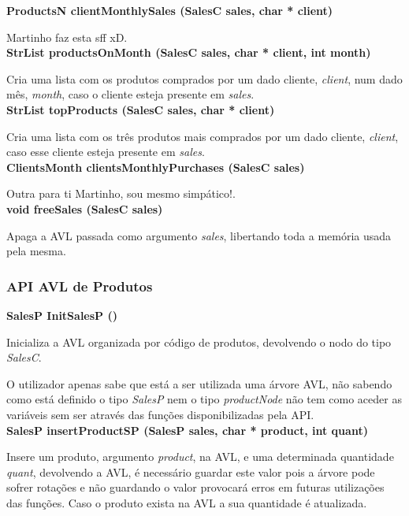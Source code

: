 \documentclass[10pt] {article}
\begin{document}
\noindent \textbf {ProductsN clientMonthlySales (SalesC sales, char * client)}
\par Martinho faz esta sff xD. \\

\noindent \textbf {StrList productsOnMonth (SalesC sales, char * client, int month)}
\par Cria uma lista com os produtos comprados por um dado cliente, \emph{client}, num dado mês, \emph{month}, 
caso o cliente esteja presente em \emph{sales}. \\

\noindent \textbf {StrList topProducts (SalesC sales, char * client)}
\par Cria uma lista com os três produtos mais comprados por um dado cliente, \emph{client}, caso esse cliente 
esteja presente em \emph{sales}. \\

\noindent \textbf {ClientsMonth clientsMonthlyPurchases (SalesC sales)}
\par Outra para ti Martinho, sou mesmo simpático!. \\

\noindent \textbf {void freeSales (SalesC sales)}
\par Apaga a AVL passada como argumento \emph{sales}, libertando toda a memória usada pela mesma. \\

\subsubsection{API AVL de Produtos}
 \noindent \textbf {SalesP InitSalesP ()}
 \par Inicializa a AVL organizada por código de produtos, devolvendo o nodo do tipo \emph{SalesC}.
 \par O utilizador apenas sabe que está a ser utilizada uma árvore AVL, não sabendo como está definido o tipo 
 \emph{SalesP} nem o tipo \emph{productNode} não tem como aceder as variáveis sem ser através das funções 
 disponibilizadas pela API. \\

 \newpage
\noindent \textbf {SalesP insertProductSP (SalesP sales, char * product, int quant)}
\par Insere um produto, argumento \emph{product}, na AVL, e uma determinada quantidade \emph{quant}, 
devolvendo a AVL, é necessário guardar este valor pois a árvore pode sofrer rotações e não guardando o valor 
provocará erros em futuras utilizações das funções. Caso o produto exista na AVL a sua quantidade é atualizada.\\
\end{document}
